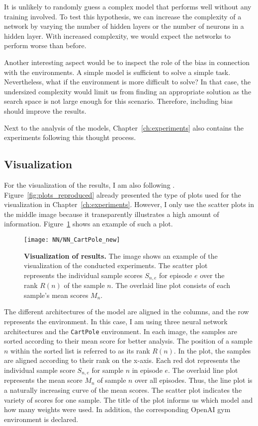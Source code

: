 It is unlikely to randomly guess a complex model that performs well without any training involved. To test this hypothesis, we can increase the complexity of a network by varying the number of hidden layers or the number of neurons in a hidden layer. With increased complexity, we would expect the networks to perform worse than before.

Another interesting aspect would be to inspect the role of the bias in connection with the environments. A simple model is sufficient to solve a simple task. Nevertheless, what if the environment is more difficult to solve? In that case, the undersized complexity would limit us from finding an appropriate solution as the search space is not large enough for this scenario. Therefore, including bias should improve the results.

Next to the analysis of the models, Chapter~\ref{ch:experiments} also contains the experiments following this thought process.

\subsection{Visualization}
For the visualization of the results, I am also following \cite{oller_analyzing_2020}. Figure~\ref{fig:plots_reproduced} already presented the type of plots used for the visualization in Chapter~\ref{ch:experiments}. However, I only use the scatter plots in the middle image because it transparently illustrates a high amount of information. Figure~\ref{fig:visualization} shows an example of such a plot.
\begin{figure}[!ht]
  \centering
\texttt{[image: NN/NN\_CartPole\_new]}
\caption[Visualization of results]{
  \textbf{Visualization of results.}
  The image shows an example of the visualization of the conducted experiments. The scatter plot represents the individual sample scores $S_{n,e}$ for episode $e$ over the rank $R(n)$ of the sample $n$. The overlaid line plot consists of each sample's mean scores $M_n$.
}
\label{fig:visualization}
\end{figure}
The different architectures of the model are aligned in the columns, and the row represents the environment. In this case, I am using three neural network architectures and the \verb|CartPole| environment. In each image, the samples are sorted according to their mean score for better analysis. The position of a sample $n$ within the sorted list is referred to as its rank $R(n)$. In the plot, the samples are aligned according to their rank on the x-axis. Each red dot represents the individual sample score $S_{n,e}$ for sample $n$ in episode $e$. The overlaid line plot represents the mean score $M_n$ of sample $n$ over all episodes. Thus, the line plot is a naturally increasing curve of the mean scores. The scatter plot indicates the variety of scores for one sample. The title of the plot informs us which model and how many weights were used. In addition, the corresponding OpenAI gym environment is declared.

